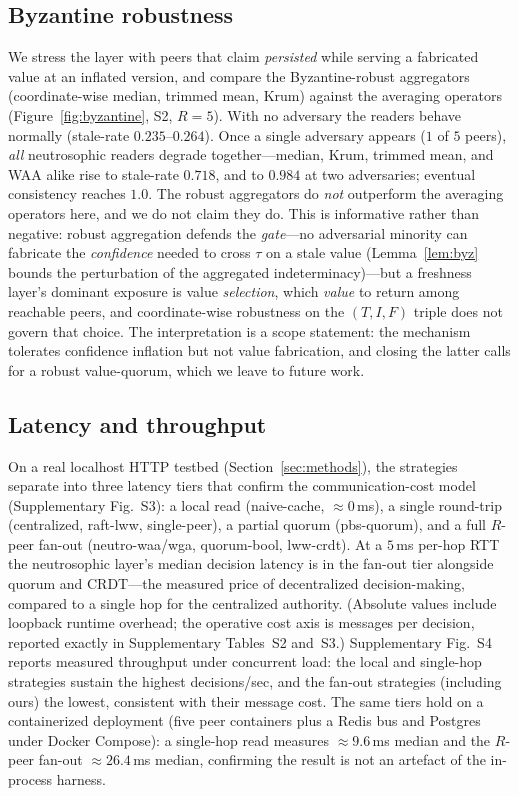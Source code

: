 \documentclass[11pt]{article}
\begin{document}
\subsection{Byzantine robustness}
We stress the layer with peers that claim
\emph{persisted} while serving a fabricated value at an inflated version, and compare the
Byzantine-robust aggregators (coordinate-wise median, trimmed mean, Krum) against the averaging
operators (Figure~\ref{fig:byzantine}, S2, $R=5$). With no adversary the readers behave normally
(stale-rate $0.235$--$0.264$). Once a single adversary appears ($1$ of $5$ peers), \emph{all}
neutrosophic readers degrade together---median, Krum, trimmed mean, and WAA alike rise to stale-rate
$0.718$, and to $0.984$ at two adversaries; eventual consistency reaches $1.0$. The robust aggregators do
\emph{not} outperform the averaging operators here, and we do not claim they do. This is informative
rather than negative: robust aggregation defends the \emph{gate}---no adversarial minority can fabricate
the \emph{confidence} needed to cross $\tau$ on a stale value (Lemma~\ref{lem:byz} bounds the perturbation of the
aggregated indeterminacy)---but a freshness layer's dominant exposure is value \emph{selection}, which
\emph{value} to return among reachable peers, and coordinate-wise robustness on the $(T,I,F)$ triple does
not govern that choice. The interpretation is a scope statement: the mechanism tolerates confidence
inflation but not value fabrication, and closing the latter calls for a robust value-quorum, which we
leave to future work.

\subsection{Latency and throughput}
On a real localhost HTTP testbed (Section~\ref{sec:methods}), the
strategies separate into three latency tiers that confirm the communication-cost model
(Supplementary Fig.~S3): a local read (naive-cache, $\approx 0$\,ms), a single round-trip
(centralized, raft-lww, single-peer), a partial quorum (pbs-quorum), and a full $R$-peer fan-out
(neutro-waa/wga, quorum-bool, lww-crdt). At a $5$\,ms per-hop RTT the neutrosophic layer's median
decision latency is in the fan-out tier alongside quorum and CRDT---the measured price of decentralized
decision-making, compared to a single hop for the centralized authority. (Absolute values include loopback
runtime overhead; the operative cost axis is messages per decision, reported exactly in
Supplementary Tables~S2 and~S3.) Supplementary Fig.~S4 reports measured
throughput under concurrent load: the local and single-hop strategies sustain the highest
decisions/sec, and the fan-out strategies (including ours) the lowest, consistent with their message
cost. The same tiers hold on a containerized deployment (five peer containers plus a Redis bus and
Postgres under Docker Compose): a single-hop read measures $\approx 9.6$\,ms median and the $R$-peer
fan-out $\approx 26.4$\,ms median, confirming the result is not an artefact of the in-process harness.
\end{document}

